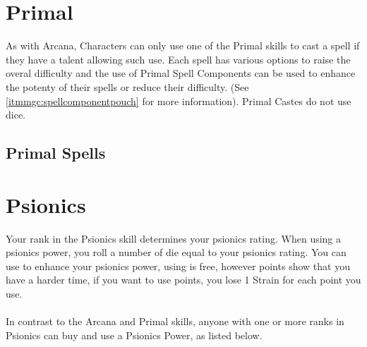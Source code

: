 \begin{multicols}{2}

\section{Primal}

As with Arcana, Characters can only use one of the Primal skills to cast a spell if they
have a talent allowing such use. Each spell has various options to raise the overal
difficulty and the use of Primal Spell Components can be used to enhance the potenty
of their spells or reduce their difficulty. (See \cref{itmmgc:spellcomponentpouch}
for more information). Primal Castes do not use \force dice.

\subsection{Primal Spells}





\FloatBarrier

\section{Psionics}
Your rank in the Psionics skill determines your psionics rating.
When using a psionics power, you roll a number of \force die equal to your
psionics rating. You can use \darklight to enhance your psionics power,
using \light is free, however \dark points show that you have a harder time,
if you want to use \dark points, you lose 1 Strain for each \dark point you
use.\\
\\
In contrast to the Arcana and Primal skills, anyone with one or more ranks
in Psionics can buy and use a Psionics Power, as listed below.\\

\end{multicols}
\newpage

%


%
%

%

%

%
